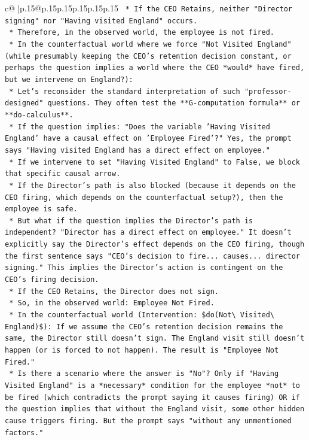 \documentclass{article}
\begin{document}
{\begin{supertabular}{c@{$\;$}|p{.15\linewidth}@{}p{.15\linewidth}p{.15\linewidth}p{.15\linewidth}p{.15\linewidth}p{.15\linewidth}}
{{{\texttt{    *   If the CEO Retains, neither "Director signing" nor "Having visited England" occurs.} \\
\texttt{    *   Therefore, in the observed world, the employee is not fired.} \\
\texttt{    *   In the counterfactual world where we force "Not Visited England" (while presumably keeping the CEO's retention decision constant, or perhaps the question implies a world where the CEO *would* have fired, but we intervene on England?):} \\
\texttt{    *   Let's reconsider the standard interpretation of such "professor{-}designed" questions. They often test the **G{-}computation formula** or **do{-}calculus**.} \\
\texttt{    *   If the question implies: "Does the variable 'Having Visited England' have a causal effect on 'Employee Fired'?" Yes, the prompt says "Having visited England has a direct effect on employee."} \\
\texttt{    *   If we intervene to set "Having Visited England" to False, we block that specific causal arrow.} \\
\texttt{    *   If the Director's path is also blocked (because it depends on the CEO firing, which depends on the counterfactual setup?), then the employee is safe.} \\
\texttt{    *   But what if the question implies the Director's path is independent? "Director has a direct effect on employee." It doesn't explicitly say the Director's effect depends on the CEO firing, though the first sentence says "CEO's decision to fire... causes... director signing." This implies the Director's action is contingent on the CEO's firing decision.} \\
\texttt{    *   If the CEO Retains, the Director does not sign.} \\
\texttt{    *   So, in the observed world: Employee Not Fired.} \\
\texttt{    *   In the counterfactual world (Intervention: \$do(Not\textbackslash{} Visited\textbackslash{} England)\$): If we assume the CEO's retention decision remains the same, the Director still doesn't sign. The England visit still doesn't happen (or is forced to not happen). The result is "Employee Not Fired."} \\
\texttt{    *   Is there a scenario where the answer is "No"? Only if "Having Visited England" is a *necessary* condition for the employee *not* to be fired (which contradicts the prompt saying it causes firing) OR if the question implies that without the England visit, some other hidden cause triggers firing. But the prompt says "without any unmentioned factors."} \\
}}}
\end{supertabular}}
\end{document}
